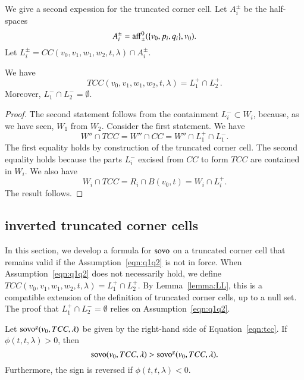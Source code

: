 We give a second expession for the truncated corner cell.
Let $A_i^\pm$ be the half-spaces
$$
  A_i^\pm = {\operatorname{aff}}_\pm^0(\{v_0,p_i,q_i\},v_0).
$$
Let $L_i^\pm = CC(v_0,v_1,w_1,w_2,t,\lambda)\cap A_i^\pm$.

\begin{lemma}\label{lemma:LL}
We have
  $$
  TCC(v_0,v_1,w_1,w_2,t,\lambda) = L_1^+\cap L_2^+.
  $$
Moreover, 
$L_1^-\cap L_2^- =\emptyset$.
\end{lemma}

\begin{proof}
The second statement follows from the containment
   $L_i^- \subset W_i$, because, as we have seen,
$W_1$
from $W_2$.
Consider the first statement.  
We have
 $$
 W'' \cap TCC = W'' \cap CC = W'' \cap L_1^+ \cap L_1^-.
 $$
The first equality holds by construction of the truncated corner
cell.  The second equality holds because the parts $L_i^-$ excised
from $CC$ to form $TCC$ are contained in $W_i$.
We also have
  $$
  W_i \cap TCC = R_i \cap B(v_0,t) = W_i  \cap L_i^+.
  $$
The result follows.
\end{proof}




\subsection{inverted truncated corner cells}

In this section, we develop a formula for ${\operatorname{sovo}}$ on 
a truncated corner cell that remains valid if the 
Assumption~\ref{eqn:q1q2} is not in force.
When Assumption~\ref{eqn:q1q2} does not necessarily hold, we
define $TCC(v_0,v_1,w_1,w_2,t,\lambda) = L_1^+ \cap L_2^+$.
By Lemma~\ref{lemma:LL}, 
this is a compatible extension of the definition
of truncated corner cells, up to a null set.
The proof that $L_1^+\cap L_2^- = \emptyset$ 
relies on Assumption~\ref{eqn:q1q2}.


\begin{lemma} Let ${\operatorname{sovo}}^g(v_0,TCC,\lambda)$ be given
by the right-hand side of Equation~\ref{eqn:tcc}.
If $\phi(t,t,\lambda) > 0$, then
   $$
   {\operatorname{sovo}}(v_0,TCC,\lambda) > {\operatorname{sovo}}^g(v_0,TCC,\lambda).
   $$
Furthermore, the sign is reversed if $\phi(t,t,\lambda) < 0$.
\end{lemma}

